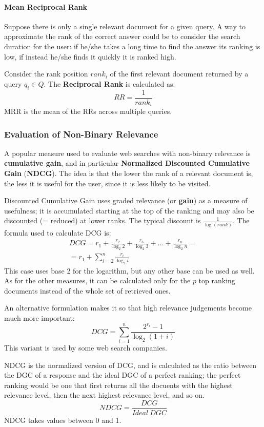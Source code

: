 \paragraph{Mean Reciprocal Rank}

Suppose there is only a single relevant document for a given query. A way to approximate the rank of the correct answer could be to consider the search duration for the user: if he/she takes a long time to find the answer its ranking is low, if instead he/she finds it quickly it is ranked high.

Consider the rank position $\textit{rank}_i$ of the first relevant document returned by a query $q_i \in Q$. The \textbf{Reciprocal Rank} is calculated as:
\begin{equation*}
    \textit{RR} = \frac{1}{\textit{rank}_i}
\end{equation*}
MRR is the mean of the RRs across multiple queries.

\subsubsection{Evaluation of Non-Binary Relevance}

A popular measure used to evaluate web searches with non-binary relevance is \textbf{cumulative gain}, and in particular \textbf{Normalized Discounted Cumulative Gain} (\textbf{NDCG}). The idea is that the lower the rank of a relevant document is, the less it is useful for the user, since it is less likely to be visited.

Discounted Cumulative Gain uses graded relevance (or \textbf{gain}) as a measure of usefulness; it is accumulated starting at the top of the ranking and may also be discounted (= reduced) at lower ranks. The typical discount is $\frac{1}{\log(\textit{rank})}$. The formula used to calculate DCG is:
\begin{gather*}
    \textit{DCG} = r_1 + \frac{r_2}{\log_2 2} + \frac{r_3}{\log_2 3} + \dots + \frac{r_n}{\log_2 n} = \\
    = r_1 + \sum_{i=2}^n \frac{r_i}{\log_2 i}
\end{gather*}
This case uses base 2 for the logarithm, but any other base can be used as well. As for the other measures, it can be calculated only for the $p$ top ranking documents instead of the whole set of retrieved ones.

An alternative formulation makes it so that high relevance judgements become much more important:
\begin{equation*}
    \textit{DCG} = \sum_{i=1}^n \frac{2^{r_i} - 1}{\log_2(1+i)}
\end{equation*}
This variant is used by some web search companies.

NDCG is the normalized version of DCG, and is calculated as the ratio between the DGC of a response and the ideal DGC of a perfect ranking; the perfect ranking would be one that first returns all the docuents with the highest relevance level, then the next highest relevance level, and so on.
\begin{equation*}
    \textit{NDCG} = \frac{DCG}{\textit{Ideal} \ DGC}
\end{equation*}
NDCG takes values between 0 and 1.